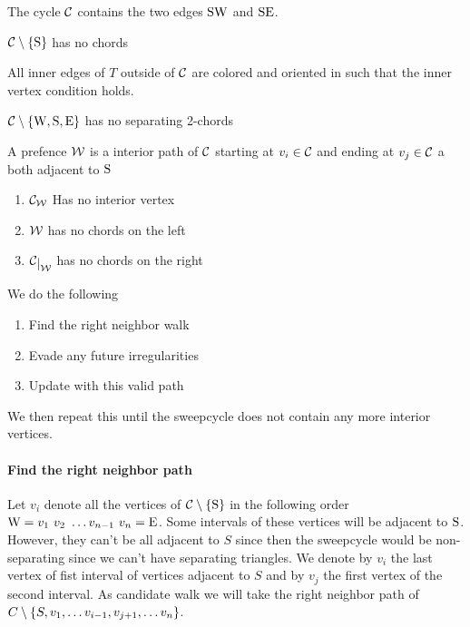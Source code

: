   \begin{invariants}
    \itemsep=-4pt

    \item \label{i:uni:SWandSE} The cycle $\mathcal{C}$ contains the two edges $\mathrm{S} \mathrm{W}$ and $\mathrm{S} \mathrm{E}$.
    \item \label{i:uni:noChords} $\mathcal{C} \setminus \left\lbrace {\mathrm{S}} \right\rbrace$ has no chords
    \item \label{i:uni:intVertCond} All inner edges of $T$ outside of $\mathcal{C}$ are colored and oriented in such that the inner vertex condition holds. %
    \item \label{i:uni:no2Chords} $\mathcal{C}\setminus \left\lbrace {\mathrm{W}, \mathrm{S}, \mathrm{E}} \right\rbrace$ has no separating 2-chords
  \end{invariants}





  \begin{defi}[Prefence]
  A prefence $\mathcal{W}$ is a interior path of $\mathcal{C}$ starting at $v_i \in \mathcal{C}$ and ending at $v_j \in \mathcal{C}$ a both adjacent to $\mathrm{S}$
  \begin{enumerate}
   \renewcommand*{\labelenumi}{(P\arabic{enumi})}%
   \renewcommand*{\theenumi}{(P\arabic{enumi})}%
    \item  $\mathcal{C}_{\mathcal{W}}$ Has no interior vertex
    \label{p:noInteriorVertex}
    \item  $\mathcal{W}$ has no chords on the left     \label{p:Wchordfree}

    \item  $\restC{\W}$ has no chords on the right     \label{p:Cchordfree}

  \end{enumerate}
  \end{defi}

  We do the following
  \begin{enumerate}
    \item Find the right neighbor walk
    \item Evade any future irregularities
    \item Update with this valid path
  \end{enumerate}

  We then repeat this until the sweepcycle does not contain any more interior vertices.

  \paragraph{Find the right neighbor path}
    Let $v_i$ denote all the vertices of $\mathcal{C} \setminus \left\lbrace {\mathrm{S}} \right\rbrace$ in the following order $\mathrm{W} =  v_1 \  v_2 \  \ldots v_{n-1} \  v_n = \mathrm{E}$.
    Some intervals of these vertices will be adjacent to $\mathrm{S}$. However, they can't be all adjacent to $S$ since then the sweepcycle would be non-separating since we can't have separating triangles. We denote by $v_i$ the last vertex of fist interval of vertices adjacent to $S$ and by $v_j$ the first vertex of the second interval.
    As candidate walk we will take the right neighbor path of $C\setminus \left\lbrace {S, v_1, \ldots v_{i-1}, v_{j+1}, \dots v_n} \right\rbrace$.

